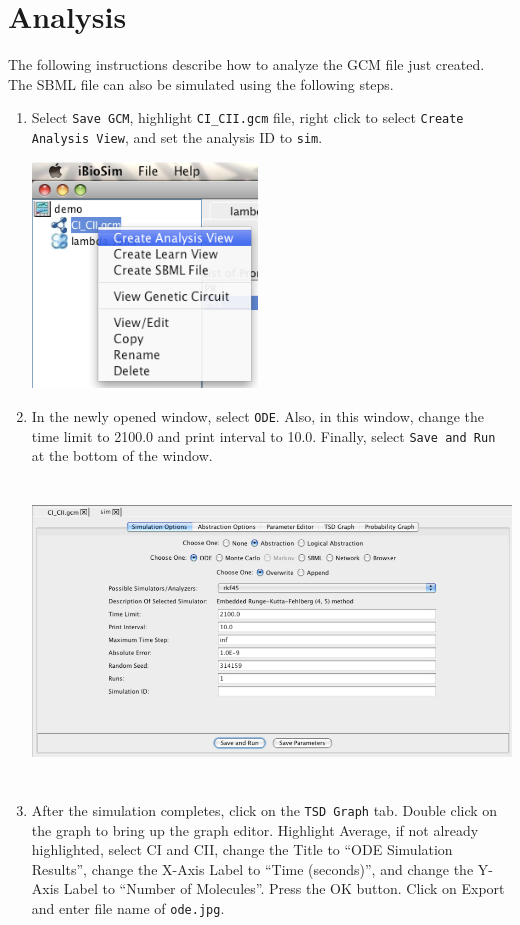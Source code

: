 \documentclass[titlepage,11pt]{article}
\begin{document}
\clearpage 

\section{Analysis}

The following instructions describe how to analyze the GCM file just 
created.  The SBML file can also be simulated using the following steps.  
\begin{enumerate}
\item Select {\tt Save GCM}, highlight {\tt CI\_CII.gcm} file,
  right click to select {\tt Create Analysis View}, and set the
  analysis ID to {\tt sim}.

\includegraphics[height=60mm]{screenshots/GCMAnalysis}

\item In the newly opened window, select {\tt ODE}.
      Also, in this window, change the time limit to 2100.0 and print interval
      to 10.0. Finally, select {\tt Save and Run} at the bottom of the window.

\includegraphics[height=80mm]{screenshots/analysisView}

\clearpage

\item After the simulation completes, click on the {\tt TSD Graph} tab.
Double click on the graph to bring up the graph editor.
  Highlight Average, if not already highlighted, select CI and CII, 
change the Title to ``ODE Simulation Results'', 
change the X-Axis Label to ``Time
(seconds)'', and change the Y-Axis Label to ``Number of Molecules''.  
Press the OK button.  Click on Export and enter file name of {\tt ode.jpg}.


\end{enumerate}
\end{document}
